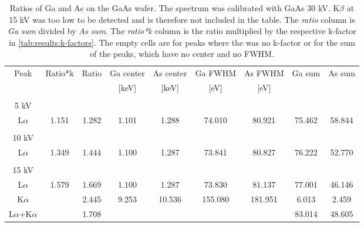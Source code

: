 \begin{table}[ht]
    \centering
    \caption{
        Ratios of Ga and As on the GaAs wafer.
        The spectrum was calibrated with GaAs 30 kV.
        K$\beta$ at 15 kV was too low to be detected and is therefore not included in the table.
        The \emph{ratio} column is \emph{Ga sum} divided by \emph{As sum}.
        The \emph{ratio*k} column is the ratio multiplied by the respective k-factor in \cref{tab:results:k-factors}.
        The empty cells are for peaks where the was no k-factor or for the sum of the peaks, which have no center and no FWHM.
    }
    \label{tab:results:ratios}
    \begin{tabular}{ccccccccc}

        Peak                         & Ratio*k & Ratio & Ga center & As center & Ga FWHM & As FWHM & Ga sum  & As sum \\
                                     &         &       & [keV]     & [keV]     & [eV]    & [eV]    &         &        \\
        \hline
                                     &         &       &           &           &         &         &         &        \\

        5 kV                         &         &       &           &           &         &         &         &        \\
        L$\alpha$                    & 1.151   & 1.282 & 1.101     & 1.288     & 74.010  & 80.921  & 75.462  & 58.844 \\
        \hline
                                     &         &       &           &           &         &         &         &        \\
        10 kV                        &         &       &           &           &         &         &         &        \\
        L$\alpha$                    & 1.349   & 1.444 & 1.100     & 1.287     & 73.841  & 80.827  & 76.222  & 52.770 \\

        \hline
                                     &         &       &           &           &         &         &         &        \\
        15 kV                        &         &       &           &           &         &         &         &        \\
        L$\alpha$                    & 1.579   & 1.669 & 1.100     & 1.287     & 73.830  & 81.137  & 77.001  & 46.146 \\
        K$\alpha$                    &         & 2.445 & 9.253     & 10.536    & 155.080 & 181.951 & 6.013   & 2.459  \\
        L$\alpha$+K$\alpha$          &         & 1.708 &           &           &         &         & 83.014  & 48.605 \\


\end{tabular}
\end{table}
